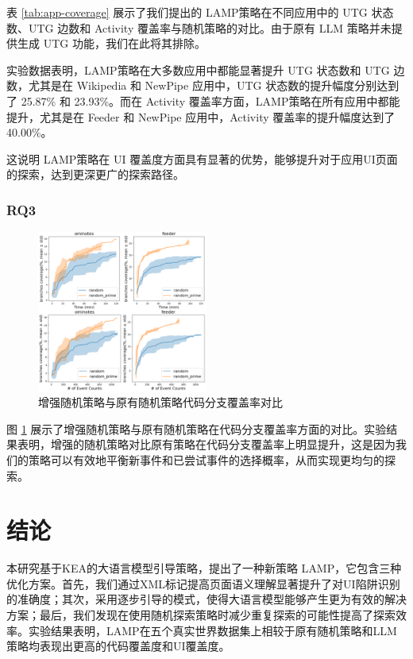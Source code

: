 \documentclass[twocolumn, 10pt]{article}
\newcommand{\kea}{K{\small\MakeUppercase{ea}}}
\newcommand{\lamp}{L{\small\MakeUppercase{amp}}}
\begin{document}
表 \ref{tab:app-coverage} 展示了我们提出的 \lamp 策略在不同应用中的 UTG 状态数、UTG 边数和 Activity 覆盖率与随机策略的对比。由于原有 LLM 策略并未提供生成 UTG 功能，我们在此将其排除。

实验数据表明，\lamp 策略在大多数应用中都能显著提升 UTG 状态数和 UTG 边数，尤其是在 Wikipedia 和 NewPipe 应用中，UTG 状态数的提升幅度分别达到了 25.87\% 和 23.93\%。而在 Activity 覆盖率方面，\lamp 策略在所有应用中都能提升，尤其是在 Feeder 和 NewPipe 应用中，Activity 覆盖率的提升幅度达到了 40.00\%。

这说明 \lamp 策略在 UI 覆盖度方面具有显著的优势，能够提升对于应用UI页面的探索，达到更深更广的探索路径。

\subsubsection{RQ3}

\begin{figure}[t]
\centering
\includegraphics[width=0.5\textwidth]{rq3.png}
\caption{增强随机策略与原有随机策略代码分支覆盖率对比}
\label{fig:rq3}
\end{figure}

图 \ref{fig:rq3} 展示了增强随机策略与原有随机策略在代码分支覆盖率方面的对比。实验结果表明，增强的随机策略对比原有策略在代码分支覆盖率上明显提升，这是因为我们的策略可以有效地平衡新事件和已尝试事件的选择概率，从而实现更均匀的探索。

\section{结论}

本研究基于\kea 的大语言模型引导策略，提出了一种新策略 \lamp，它包含三种优化方案。首先，我们通过XML标记提高页面语义理解显著提升了对UI陷阱识别的准确度；其次，采用逐步引导的模式，使得大语言模型能够产生更为有效的解决方案；最后，我们发现在使用随机探索策略时减少重复探索的可能性提高了探索效率。实验结果表明，\lamp 在五个真实世界数据集上相较于原有随机策略和LLM策略均表现出更高的代码覆盖度和UI覆盖度。
\end{document}
